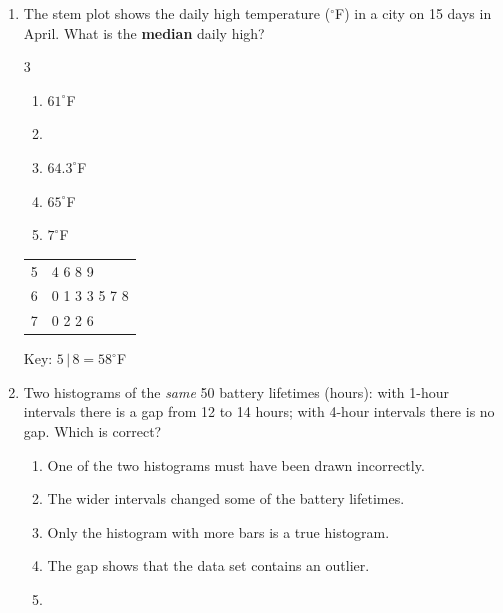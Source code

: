 \documentclass[12pt]{article}
\newenvironment{choices}
  {\begin{enumerate}[label=\textbf{(\Alph*)}, leftmargin=2.2em, itemsep=0pt, topsep=1pt]}
  {\end{enumerate}}
\newcommand{\letterroom}{\rule[-15pt]{0pt}{36pt}}
\begin{document}
\begin{enumerate}[leftmargin=1.9em, itemsep=0.03in]
  \boxguard[10]
  \item \begin{minipage}[t]{0.62\linewidth}\raggedright
        The stem plot shows the daily high temperature ($^\circ$F) in a city on 15 days in
        April. What is the \textbf{median} daily high?
        \begin{multicols}{3}
        \begin{choices}
          \item $61^\circ$F
          \item {}
          \item $64.3^\circ$F
          \item $65^\circ$F
          \item $7^\circ$F
        \end{choices}
        \end{multicols}
        \vspace{0.32in}
        \end{minipage}\hfill
        \begin{minipage}[t]{0.32\linewidth}
        \centering\small
        \begin{tabular}[t]{@{} r | l @{}}
        5 & 4 6 8 9 \\
        6 & 0 1 3 3 5 7 8 \\
        7 & 0 2 2 6 \\
        \end{tabular}\par\vspace{2pt}
        {\footnotesize Key: $5\,|\,8 = 58^\circ$F}
        \end{minipage}

  \boxguard[10]
  \item Two histograms of the \emph{same} 50 battery lifetimes (hours): with 1-hour intervals there
        is a gap from 12 to 14 hours; with 4-hour intervals there is no gap. Which is correct?
        \begin{choices}
          \item One of the two histograms must have been drawn incorrectly.
          \item The wider intervals changed some of the battery lifetimes.
          \item Only the histogram with more bars is a true histogram.
          \item The gap shows that the data set contains an outlier.
          \item {}
                \hfill{}\letterroom
        \end{choices}


\end{enumerate}
\end{document}
